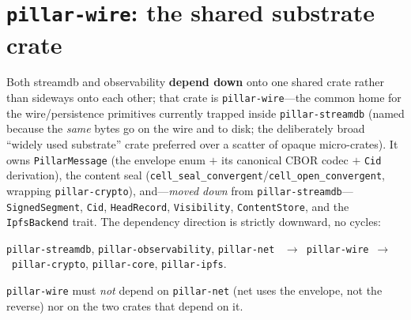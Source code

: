 \documentclass[10pt,twocolumn]{article}
\newcommand{\code}[1]{\texttt{\small #1}}
\newcommand{\Cid}{\code{Cid}}
\begin{document}
\section{\code{pillar-wire}: the shared substrate crate}
Both streamdb and observability \textbf{depend down} onto one shared crate rather
than sideways onto each other; that crate is \code{pillar-wire}---the common home
for the wire/persistence primitives currently trapped inside \code{pillar-streamdb}
(named because the \emph{same} bytes go on the wire and to disk; the deliberately
broad ``widely used substrate'' crate preferred over a scatter of opaque
micro-crates). It owns \code{PillarMessage} (the envelope enum $+$ its canonical
CBOR codec $+$ \Cid{} derivation), the content seal
(\code{cell\_seal\_convergent}/\code{cell\_open\_convergent}, wrapping
\code{pillar-crypto}), and---\emph{moved down} from \code{pillar-streamdb}---
\code{SignedSegment}, \code{Cid}, \code{HeadRecord}, \code{Visibility},
\code{ContentStore}, and the \code{IpfsBackend} trait. The dependency direction is
strictly downward, no cycles:
\begin{center}\footnotesize
\code{pillar-streamdb}, \code{pillar-observability}, \code{pillar-net}
\ $\to$\ \code{pillar-wire}\ $\to$\
\code{pillar-crypto}, \code{pillar-core}, \code{pillar-ipfs}.
\end{center}
\code{pillar-wire} must \emph{not} depend on \code{pillar-net} (net uses the
envelope, not the reverse) nor on the two crates that depend on it.
\end{document}
